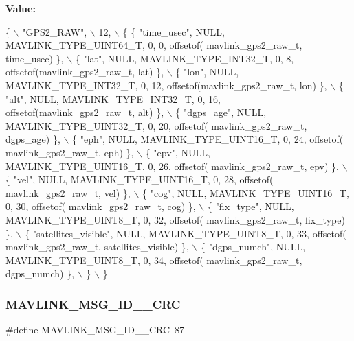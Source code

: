 {\bfseries Value\+:}
\begin{DoxyCode}
\{ \(\backslash\)
    \textcolor{stringliteral}{"GPS2\_RAW"}, \(\backslash\)
    12, \(\backslash\)
    \{  \{ \textcolor{stringliteral}{"time\_usec"}, NULL, MAVLINK_TYPE_UINT64_T, 0, 0, offsetof(
      mavlink_gps2_raw_t, time\_usec) \}, \(\backslash\)
         \{ \textcolor{stringliteral}{"lat"}, NULL, MAVLINK_TYPE_INT32_T, 0, 8, offsetof(mavlink_gps2_raw_t, lat) \}, \(\backslash\)
         \{ \textcolor{stringliteral}{"lon"}, NULL, MAVLINK_TYPE_INT32_T, 0, 12, offsetof(mavlink_gps2_raw_t, lon) \}, \(\backslash\)
         \{ \textcolor{stringliteral}{"alt"}, NULL, MAVLINK_TYPE_INT32_T, 0, 16, offsetof(mavlink_gps2_raw_t, alt) \}, \(\backslash\)
         \{ \textcolor{stringliteral}{"dgps\_age"}, NULL, MAVLINK_TYPE_UINT32_T, 0, 20, offsetof(
      mavlink_gps2_raw_t, dgps\_age) \}, \(\backslash\)
         \{ \textcolor{stringliteral}{"eph"}, NULL, MAVLINK_TYPE_UINT16_T, 0, 24, offsetof(
      mavlink_gps2_raw_t, eph) \}, \(\backslash\)
         \{ \textcolor{stringliteral}{"epv"}, NULL, MAVLINK_TYPE_UINT16_T, 0, 26, offsetof(
      mavlink_gps2_raw_t, epv) \}, \(\backslash\)
         \{ \textcolor{stringliteral}{"vel"}, NULL, MAVLINK_TYPE_UINT16_T, 0, 28, offsetof(
      mavlink_gps2_raw_t, vel) \}, \(\backslash\)
         \{ \textcolor{stringliteral}{"cog"}, NULL, MAVLINK_TYPE_UINT16_T, 0, 30, offsetof(
      mavlink_gps2_raw_t, cog) \}, \(\backslash\)
         \{ \textcolor{stringliteral}{"fix\_type"}, NULL, MAVLINK_TYPE_UINT8_T, 0, 32, offsetof(
      mavlink_gps2_raw_t, fix\_type) \}, \(\backslash\)
         \{ \textcolor{stringliteral}{"satellites\_visible"}, NULL, MAVLINK_TYPE_UINT8_T, 0, 33, offsetof(
      mavlink_gps2_raw_t, satellites\_visible) \}, \(\backslash\)
         \{ \textcolor{stringliteral}{"dgps\_numch"}, NULL, MAVLINK_TYPE_UINT8_T, 0, 34, offsetof(
      mavlink_gps2_raw_t, dgps\_numch) \}, \(\backslash\)
         \} \(\backslash\)
\}
\end{DoxyCode}
\mbox{\label{mavlink__msg__gps2__raw_8h_ab5e4223e00fcd5774c3f73c2d0fefed4}} 
\subsubsection{M\+A\+V\+L\+I\+N\+K\+\_\+\+M\+S\+G\+\_\+\+I\+D\+\_\+\_\+\+C\+RC}
{\footnotesize\ttfamily \#define M\+A\+V\+L\+I\+N\+K\+\_\+\+M\+S\+G\+\_\+\+I\+D\+\_\+\_\+\+C\+RC~87}

